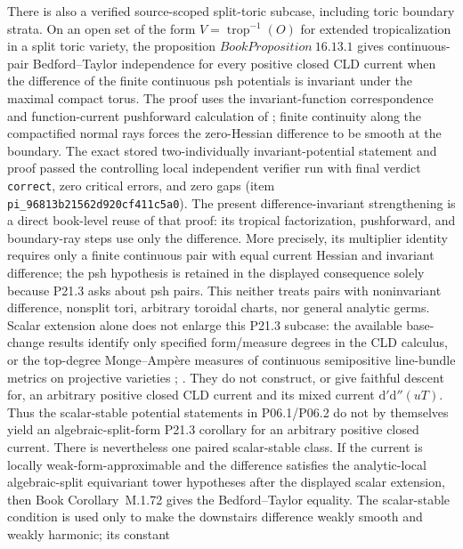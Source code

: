 \documentclass[11pt,a4paper]{article}
\theoremstyle{definition}
\theoremstyle{remark}
\begin{document}
There is also a verified source-scoped split-toric subcase, including toric
boundary strata.  On an open set of the form
\(V=\operatorname{trop}^{-1}(O)\) for extended tropicalization in a split
toric variety, the
proposition
\(Book Proposition~16.13.1\) gives
continuous-pair Bedford--Taylor independence for every positive closed CLD
current when the difference of the finite continuous psh potentials is
invariant under the maximal compact torus.  The proof uses the
invariant-function correspondence and function-current pushforward
calculation of \cite[(5.5) and Proposition~5.3.10(iv)]{BGJKK25}; finite
continuity along the compactified normal rays forces the zero-Hessian
difference to be smooth at the boundary.  The exact stored two-individually
invariant-potential statement and proof passed the controlling local
independent verifier run with final verdict \texttt{correct}, zero critical
errors, and zero gaps (item \texttt{pi\_96813b21562d920cf411c5a0}).  The
present difference-invariant strengthening is a direct book-level reuse of
that proof: its tropical factorization, pushforward, and boundary-ray steps
use only the difference.  More precisely, its multiplier identity requires
only a finite continuous pair with equal current Hessian and invariant
difference; the psh hypothesis is retained in the displayed consequence
solely because P21.3 asks about psh pairs.  This neither treats pairs with noninvariant
difference, nonsplit tori, arbitrary toroidal charts, nor general analytic
germs.  Scalar extension alone does not enlarge this P21.3 subcase:
the available base-change results identify only specified form/measure degrees
in the CLD calculus, or the top-degree Monge--Amp\`ere measures of continuous
semipositive line-bundle metrics on projective varieties
\cite[Propositions~15.3.1--15.3.2]{CLD25};
\cite[Proposition~8.4.2]{BGJKK25}.
They do not construct, or give faithful descent for, an arbitrary positive
closed CLD current and its mixed current
\(\mathrm d'\mathrm d''(uT)\).  Thus the scalar-stable potential statements
in P06.1/P06.2 do not by themselves yield an algebraic-split-form P21.3
corollary for an arbitrary positive closed current.  There is nevertheless
one paired scalar-stable class.  If the current is locally
weak-form-approximable and the difference satisfies the analytic-local
algebraic-split equivariant tower hypotheses after the displayed scalar extension, then
Book Corollary~M.1.72 gives the
Bedford--Taylor equality.  The scalar-stable condition is used only to make
the downstairs difference weakly smooth and weakly harmonic; its constant
\end{document}

